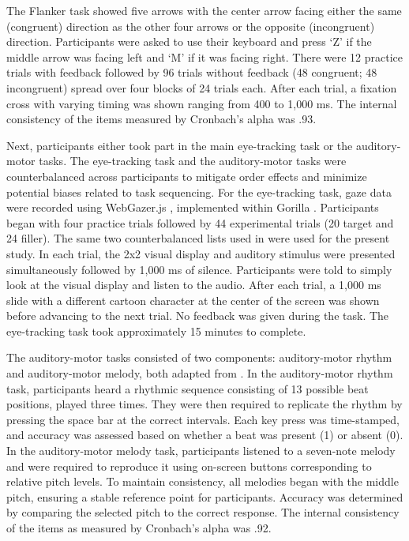 The Flanker task showed five arrows with the center arrow facing either the same (congruent) direction as the other four arrows or the opposite (incongruent) direction. Participants were asked to use their keyboard and press ‘Z’ if the middle arrow was facing left and ‘M’ if it was facing right. There were 12 practice trials with feedback followed by 96 trials without feedback (48 congruent; 48 incongruent) spread over four blocks of 24 trials each. After each trial, a fixation cross with varying timing was shown ranging from 400 to 1,000 ms. The internal consistency of the items measured by Cronbach’s alpha was .93.

Next, participants either took part in the main eye-tracking task or the auditory-motor tasks. The eye-tracking task and the auditory-motor tasks were counterbalanced across participants to mitigate order effects and minimize potential biases related to task sequencing. For the eye-tracking task, gaze data were recorded using WebGazer.js \citep{Papoutsaki}, implemented within Gorilla \citep{Anwyl-Irvine_2019}. Participants began with four practice trials followed by 44 experimental trials (20 target and 24 filler). The same two counterbalanced lists used in \cite{Ge2021} were used for the present study. In each trial, the 2x2 visual display and auditory stimulus were presented simultaneously followed by 1,000 ms of silence. Participants were told to simply look at the visual display and listen to the audio. After each trial, a 1,000 ms slide with a different cartoon character at the center of the screen was shown before advancing to the next trial. No feedback was given during the task. The eye-tracking task took approximately 15 minutes to complete.

The auditory-motor tasks consisted of two components: auditory-motor rhythm and auditory-motor melody, both adapted from \citep{Kachlicka_Saito_Tierney_2019}. In the auditory-motor rhythm task, participants heard a rhythmic sequence consisting of 13 possible beat positions, played three times. They were then required to replicate the rhythm by pressing the space bar at the correct intervals. Each key press was time-stamped, and accuracy was assessed based on whether a beat was present (1) or absent (0). In the auditory-motor melody task, participants listened to a seven-note melody and were required to reproduce it using on-screen buttons corresponding to relative pitch levels. To maintain consistency, all melodies began with the middle pitch, ensuring a stable reference point for participants. Accuracy was determined by comparing the selected pitch to the correct response. The internal consistency of the items as measured by Cronbach's alpha was .92.

